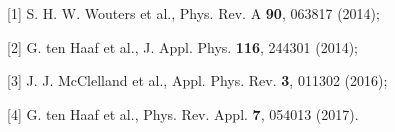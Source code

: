 {\normalsize
[1] S. H. W. Wouters et al., Phys. Rev. A \textbf{90}, 063817 (2014);
\vsp

[2] G. ten Haaf et al., J. Appl. Phys. \textbf{116}, 244301 (2014);
\vsp

[3] J. J. McClelland et al., Appl. Phys. Rev. \textbf{3}, 011302 (2016);
\vsp

[4] G. ten Haaf et al., Phys. Rev. Appl. \textbf{7}, 054013 (2017).
}

\vspace{\baselineskip} 
